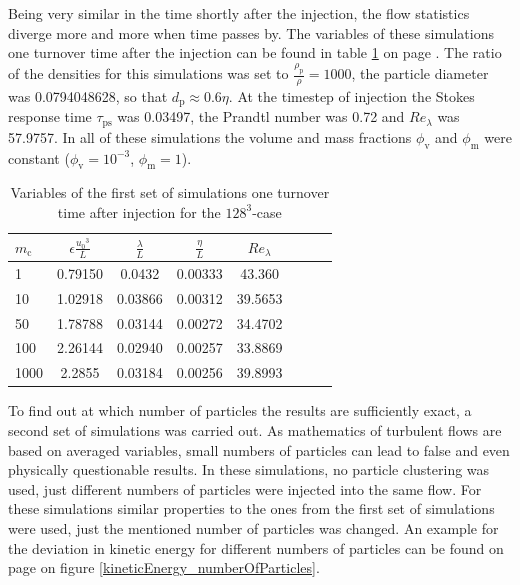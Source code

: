 \documentclass[11pt,a4paper,openany,oneside,parskip=half*]{article}
\begin{document}
\newline
Being very similar in the time shortly after the injection, the flow statistics diverge more and more when time passes by. The variables of these simulations one turnover time after the injection can be found in table \ref{table_properties} on page \pageref{table_properties}. The ratio of the densities for this simulations was set to $\frac{\rho_\mathrm{p}}{\rho} = 1000$, the particle diameter was 0.0794048628, so that $d_\mathrm{p} \approx 0.6 \eta$. At the timestep of injection the Stokes response time $\tau_\mathrm{ps}$ was 0.03497, the Prandtl number was 0.72 and $Re_\lambda$ was 57.9757. In all of these simulations the volume and mass fractions $\phi_\mathrm{v}$ and $\phi_\mathrm{m}$ were constant ($\phi_\mathrm{v}= 10^{-3}$, $\phi_\mathrm{m}=1$). 
\begin{table}[h]
\begin{center}
\begin{tabular}{l | c c c c c c c }
$m_\mathrm{c}$ & $\epsilon \frac{{u_0}^3}{L}$ & $\frac{\lambda}{L}$ & $\frac{\eta}{L} $ & $Re_\lambda$ \\
\hline
\hline
1 & 0.79150 & 0.0432 & 0.00333 & 43.360 &\\
10 & 1.02918 & 0.03866 & 0.00312 & 39.5653 &\\
50 & 1.78788 & 0.03144 & 0.00272 & 34.4702 &\\
100 & 2.26144 & 0.02940 & 0.00257 & 33.8869 &\\
1000 & 2.2855 & 0.03184 & 0.00256 & 39.8993 &\\
\hline
\end{tabular}
\caption{Variables of the first set of simulations one turnover time after injection for the $128^3$-case}
\label{table_properties}
\end{center}
\end{table}
\newline
To find out at which number of particles the results are sufficiently exact, a second set of simulations was carried out. As mathematics of turbulent flows are based on averaged variables, small numbers of particles can lead to false and even physically questionable results. In these simulations, no particle clustering was used, just different numbers of particles were injected into the same flow. For these simulations similar properties to the ones from the first set of simulations were used, just the mentioned number of particles was changed. An example for the deviation in kinetic energy for different numbers of particles can be found on page \pageref{kineticEnergy_numberOfParticles} on figure \ref{kineticEnergy_numberOfParticles}. 
\end{document}
